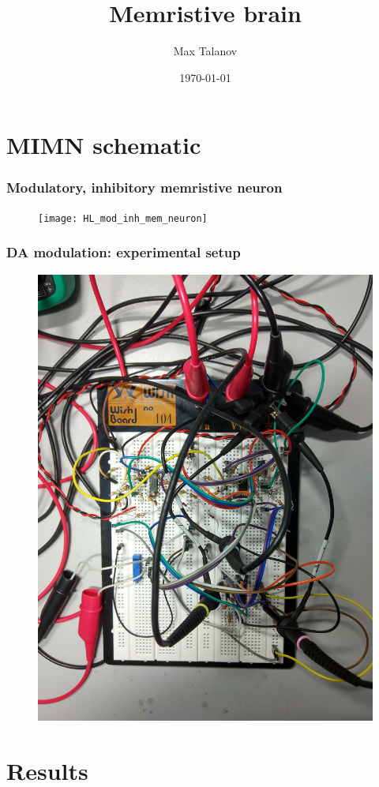 \documentclass[12pt, aspectratio=169]{beamer}
\title[Memristive brain]{Memristive brain} %
\author[Max Talanov]{
  Max Talanov
}
\institute[Neurolab: KFU]%
{
Neuro-biology lab /ITIS, KFU \\ %
\medskip
\textit{max.talanov@gmail.com} %
}
\date{\today} %
\begin{document}
\begin{frame}
\titlepage %
\end{frame}


\section{MIMN schematic}

\begin{frame}
  \frametitle{Modulatory, inhibitory memristive neuron}
  \begin{figure}
    \texttt{[image: HL\_mod\_inh\_mem\_neuron]}
  \end{figure}
\end{frame}


\begin{frame}
  \frametitle{DA modulation: experimental setup}
\begin{figure}
\includegraphics[width=0.5\linewidth, angle=90]{DA_STDP_modulation_physical_schematic}
\end{figure}
\end{frame}

\section{Results}
\end{document}
